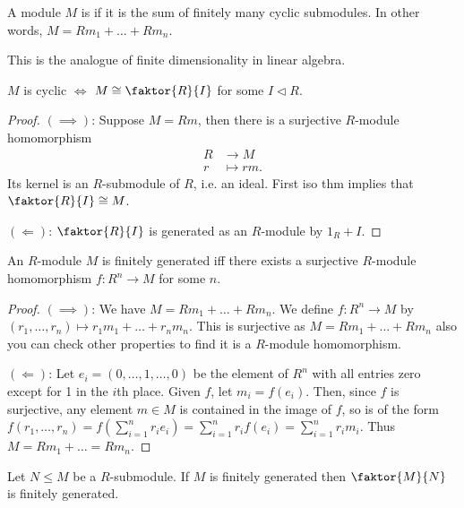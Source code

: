 \begin{definition}
	A module $M$ is  if it is the sum of finitely many cyclic submodules.
	In other words, $M = Rm_1 + \dots + Rm_n$.
\end{definition}

This is the analogue of finite dimensionality in linear algebra.

\begin{lemma} \label{lem:14.1}
	$M$ is cyclic $\iff$ $M \cong \faktor{R}{I}$ for some $I \triangleleft R$.
\end{lemma} 

\begin{proof}
	$(\implies)$: Suppose $M = Rm$, then there is a surjective $R$-module homomorphism 
	\begin{align*}
		R &\to M \\
		r &\mapsto rm.
	\end{align*} 
	Its kernel is an $R$-submodule of $R$, i.e. an ideal.
	First iso thm implies that $\faktor{R}{I} \cong M$.

	$(\Longleftarrow)$: $\faktor{R}{I}$ is generated as an $R$-module by $1_R + I$.
\end{proof} 

\begin{lemma}
	An $R$-module $M$ is finitely generated iff there exists a surjective $R$-module homomorphism $f : R^n \to M$ for some $n$.
\end{lemma}

\begin{proof}
	$(\implies)$: We have $M = Rm_1 + \dots + Rm_n$.
	We define $f : R^n \to M$ by $(r_1, \dots, r_n) \mapsto r_1 m_1 + \dots + r_n m_n$.
	This is surjective as $M = Rm_1 + \dots + Rm_n$ also you can check other properties to find it is a $R$-module homomorphism.

	$(\Longleftarrow)$: Let $e_i = (0, \dots, 1, \dots, 0)$ be the element of $R^n$ with all entries zero except for 1 in the $i$th place.
	Given $f$, let $m_i = f(e_i)$.
	Then, since $f$ is surjective, any element $m \in M$ is contained in the image of $f$, so is of the form $f(r_1, \dots, r_n) = f(\sum_{i=1}^{n} r_i e_i) = \sum_{i=1}^{n} r_i f(e_i) = \sum_{i=1}^{n} r_i m_i$.
	Thus $M = R m_1 + \dots = R m_n$.
\end{proof}

\begin{corollary} \label{cor:14.3}
	Let $N \leq M$ be a $R$-submodule.
	If $M$ is finitely generated then $\faktor{M}{N}$ is finitely generated.
\end{corollary}

